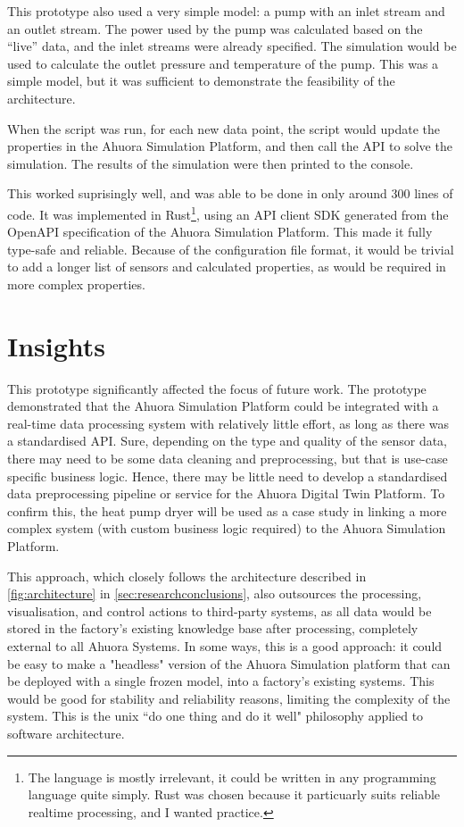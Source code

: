 \documentclass[12pt]{report}
\begin{document}
This prototype also used a very simple model: a pump with an inlet stream and an outlet stream. The power used by the pump was calculated based on the  ``live'' data, and the inlet streams were already specified. The simulation would be used to calculate the outlet pressure and temperature of the pump. This was a simple model, but it was sufficient to demonstrate the feasibility of the architecture.


When the script was run, for each new data point, the script would update the properties in the Ahuora Simulation Platform, and then call the API to solve the simulation. The results of the simulation were then printed to the console. 

This worked suprisingly well, and was able to be done in only around 300 lines of code. It was implemented in Rust\footnote{The language is mostly irrelevant, it could be written in any programming language quite simply. Rust was chosen because it particuarly suits reliable realtime processing, and I wanted practice.}, using an API client SDK generated from the OpenAPI specification of the Ahuora Simulation Platform. This made it fully type-safe and reliable. Because of the configuration file format, it would be trivial to add a longer list of sensors and calculated properties, as would be required in more complex properties.

\section{Insights}

This prototype significantly affected the focus of future work. The prototype demonstrated that the Ahuora Simulation Platform could be integrated with a real-time data processing system with relatively little effort, as long as there was a standardised API. Sure, depending on the type and quality of the sensor data, there may need to be some data cleaning and preprocessing, but that is use-case specific business logic. Hence, there may be little need to develop a standardised data preprocessing pipeline or service for the Ahuora Digital Twin Platform.
To confirm this, the heat pump dryer will be used as a case study in linking a more complex system (with custom business logic required) to the Ahuora Simulation Platform.

This approach, which closely follows the architecture described in \cref{fig:architecture} in \cref{sec:researchconclusions}, also outsources the processing, visualisation, and control actions to third-party systems, as all data would be stored in the factory's existing knowledge base after processing, completely external to all Ahuora Systems. In some ways, this is a good approach: it could be easy to make a "headless" version of the Ahuora Simulation platform that can be deployed with a single frozen model, into a factory's existing systems. This would be good for stability and reliability reasons, limiting the complexity of the system. This is the unix ``do one thing and do it well" philosophy applied to software architecture.
\end{document}
